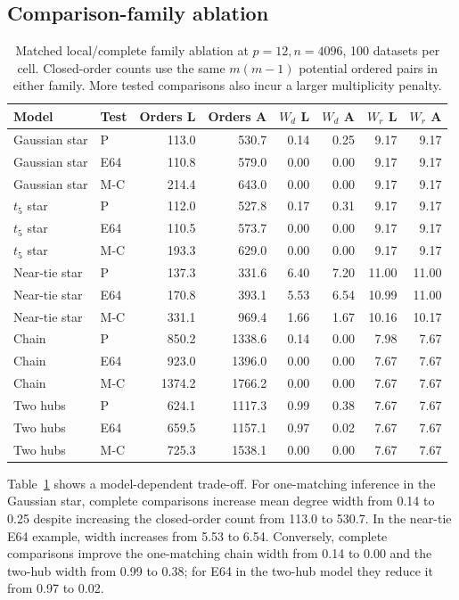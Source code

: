 \subsection{Comparison-family ablation}
\begin{table}[htbp]\centering\small
\setlength{\tabcolsep}{4pt}
\caption{Matched local/complete family ablation at $p=12,n=4096$, 100 datasets per cell. Closed-order counts use the same $m(m-1)$ potential ordered pairs in either family. More tested comparisons also incur a larger multiplicity penalty.}\label{tab:family}
\begin{lrbox}{\resultsbox}\begin{tabular}{llrrrrrr}
\toprule
Model & Test & Orders L & Orders A & $W_d$ L & $W_d$ A & $W_r$ L & $W_r$ A\\
\midrule
Gaussian star & P & 113.0 & 530.7 & 0.14 & 0.25 & 9.17 & 9.17\\
Gaussian star & E64 & 110.8 & 579.0 & 0.00 & 0.00 & 9.17 & 9.17\\
Gaussian star & M-C & 214.4 & 643.0 & 0.00 & 0.00 & 9.17 & 9.17\\
$t_5$ star & P & 112.0 & 527.8 & 0.17 & 0.31 & 9.17 & 9.17\\
$t_5$ star & E64 & 110.5 & 573.7 & 0.00 & 0.00 & 9.17 & 9.17\\
$t_5$ star & M-C & 193.3 & 629.0 & 0.00 & 0.00 & 9.17 & 9.17\\
Near-tie star & P & 137.3 & 331.6 & 6.40 & 7.20 & 11.00 & 11.00\\
Near-tie star & E64 & 170.8 & 393.1 & 5.53 & 6.54 & 10.99 & 11.00\\
Near-tie star & M-C & 331.1 & 969.4 & 1.66 & 1.67 & 10.16 & 10.17\\
Chain & P & 850.2 & 1338.6 & 0.14 & 0.00 & 7.98 & 7.67\\
Chain & E64 & 923.0 & 1396.0 & 0.00 & 0.00 & 7.67 & 7.67\\
Chain & M-C & 1374.2 & 1766.2 & 0.00 & 0.00 & 7.67 & 7.67\\
Two hubs & P & 624.1 & 1117.3 & 0.99 & 0.38 & 7.67 & 7.67\\
Two hubs & E64 & 659.5 & 1157.1 & 0.97 & 0.02 & 7.67 & 7.67\\
Two hubs & M-C & 725.3 & 1538.1 & 0.00 & 0.00 & 7.67 & 7.67\\
\bottomrule\end{tabular}\end{lrbox}\ifdim\wd\resultsbox>\linewidth\resizebox{\linewidth}{!}{\usebox{\resultsbox}}\else\usebox{\resultsbox}\fi\end{table}
Table~\ref{tab:family} shows a model-dependent trade-off. For one-matching inference in the Gaussian star, complete comparisons increase mean degree width from 0.14 to 0.25 despite increasing the closed-order count from 113.0 to 530.7. In the near-tie E64 example, width increases from 5.53 to 6.54. Conversely, complete comparisons improve the one-matching chain width from 0.14 to 0.00 and the two-hub width from 0.99 to 0.38; for E64 in the two-hub model they reduce it from 0.97 to 0.02.

